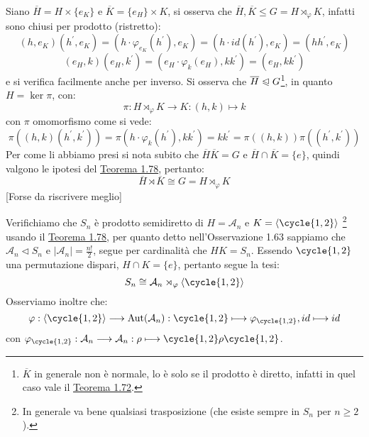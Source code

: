 \documentclass[11pt]{scrartcl}
\begin{document}
\begin{remark}
    Siano $\overline H = H \times \{e_K\}$ e $\overline K = \{e_H\} \times K$, si osserva che $\overline H, \overline K \leqslant G = H \rtimes_{\varphi} K$, infatti sono chiusi per prodotto (ristretto):
        \[ (h,e_K)(h^{\prime},e_K) = (h \cdot \varphi_{e_K}(h^{\prime}), e_K) = (h \cdot id(h^{\prime}), e_K) = (hh^{\prime},e_K)
        \]\[ (e_H,k)(e_H,k^{\prime}) = (e_H \cdot \varphi_k(e_H), kk^{\prime}) = (e_H,kk^{\prime})
            \]
    e si verifica facilmente anche per inverso. Si osserva che $\overline H \trianglelefteqslant G$\footnote{$\overline K$ in generale non è normale, lo è solo se il prodotto è diretto, infatti in quel caso vale il \hyperref[t:1.72]{Teorema 1.72}.},
    in quanto $H = \ker \pi$, con:
        \[ \pi : H \rtimes_{\varphi} K \longrightarrow K: (h,k) \longmapsto k
            \]
    con $\pi$ omomorfismo come si vede:
        \[ \pi((h,k)(h^{\prime},k^{\prime})) = \pi(h \cdot \varphi_k(h^{\prime}),kk^{\prime}) = kk^{\prime} = \pi((h,k))\pi((h^{\prime},k^{\prime}))
            \]
    Per come li abbiamo presi si nota subito che $\overline H \overline K = G$ e $\overline H \cap \overline K = \{e\}$, quindi valgono le ipotesi del \hyperref[t:1.78]{Teorema 1.78}, pertanto:
        \[ \overline H \rtimes \overline K \cong G = H \rtimes_{\varphi} K
            \]
	    [Forse da riscrivere meglio]
\end{remark}

\begin{example}
    Verifichiamo che $S_n$ è prodotto semidiretto di $H = \mathcal{A}_n$ e $ K = \left<\cycle{1,2}\right>$ \footnote{In generale va bene qualsiasi trasposizione (che esiste sempre in $S_n$ per $n \geq 2$).}
    usando il \hyperref[t:1.78]{Teorema 1.78}, per quanto detto nell'Osservazione 1.63 sappiamo che $\mathcal{A}_n \triangleleft S_n$ e $|\mathcal{A}_n| = \frac{n!}{2}$, segue
    per cardinalità che $HK = S_n$. Essendo $\cycle{1,2}$ una permutazione dispari, $H \cap K = \{e\}$, pertanto segue la tesi:
        \[ S_n \cong \mathcal{A}_n \rtimes_{\varphi} \left<\cycle{1,2}\right>
            \]
    Osserviamo inoltre che:
        \[ \varphi : \left<\cycle{1,2}\right> \longrightarrow \Aut(\mathcal{A}_n) : \cycle{1,2} \longmapsto \varphi_{\cycle{1,2}}, id \longmapsto id
            \]
    con $\varphi_{\cycle{1,2}} : \mathcal{A}_n \longrightarrow \mathcal{A}_n : \rho \longmapsto \cycle{1,2}\rho\cycle{1,2}$.
\end{example}
\end{document}
